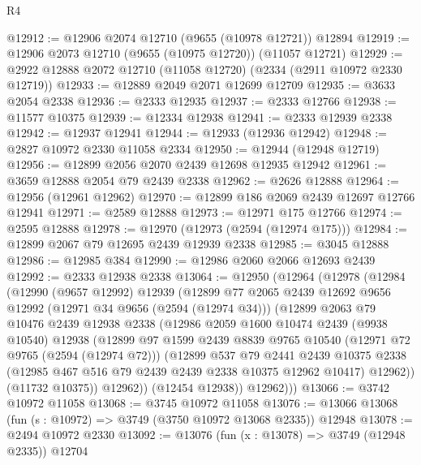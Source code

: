 \begin{lexlean}{R4}
\begin{coremodule}
@12912 := @12906 @2074 @12710 (@9655 (@10978 @12721)) @12894
@12919 := @12906 @2073 @12710 (@9655 (@10975 @12720)) (@11057 @12721)
@12929 := @2922 @12888 @2072 @12710 (@11058 @12720) (@2334 (@2911 @10972 @2330 @12719))
@12933 := @12889 @2049 @2071 @12699 @12709
@12935 := @3633 @2054 @2338
@12936 := @2333 @12935
@12937 := @2333 @12766
@12938 := @11577 @10375
@12939 := @12334 @12938
@12941 := @2333 @12939 @2338
@12942 := @12937 @12941
@12944 := @12933 (@12936 @12942)
@12948 := @2827 @10972 @2330 @11058 @2334
@12950 := @12944 (@12948 @12719)
@12956 := @12899 @2056 @2070 @2439 @12698 @12935 @12942
@12961 := @3659 @12888 @2054 @79 @2439 @2338
@12962 := @2626 @12888
@12964 := @12956 (@12961 @12962)
@12970 := @12899 @186 @2069 @2439 @12697 @12766 @12941
@12971 := @2589 @12888
@12973 := @12971 @175 @12766
@12974 := @2595 @12888
@12978 := @12970 (@12973 (@2594 (@12974 @175)))
@12984 := @12899 @2067 @79 @12695 @2439 @12939 @2338
@12985 := @3045 @12888
@12986 := @12985 @384
@12990 := @12986 @2060 @2066 @12693 @2439
@12992 := @2333 @12938 @2338
@13064 := @12950
    (@12964
      (@12978
        (@12984
          (@12990
            (@9657 @12992)
            @12939
            (@12899
              @77
              @2065
              @2439
              @12692
              @9656
              @12992
              (@12971 @34 @9656 (@2594 (@12974 @34)))
              (@12899
                @2063
                @79
                @10476
                @2439
                @12938
                @2338
                (@12986
                  @2059
                  @1600
                  @10474
                  @2439
                  (@9938 @10540)
                  @12938
                  (@12899
                    @97
                    @1599
                    @2439
                    @8839
                    @9765
                    @10540
                    (@12971 @72 @9765 (@2594 (@12974 @72)))
                    (@12899
                      @537
                      @79
                      @2441
                      @2439
                      @10375
                      @2338
                      (@12985 @467 @516 @79 @2439 @2439 @2338 @10375 @12962 @10417)
                      @12962))
                  (@11732 @10375))
                @12962))
            (@12454 @12938))
          @12962)))
@13066 := @3742 @10972 @11058
@13068 := @3745 @10972 @11058
@13076 := @13066 @13068 (fun (s : @10972) => @3749 (@3750 @10972 @13068 @2335)) @12948
@13078 := @2494 @10972 @2330
@13092 := @13076
    (fun (x : @13078) => @3749 (@12948 @2335))
    @12704

\end{coremodule}
\end{lexlean}
